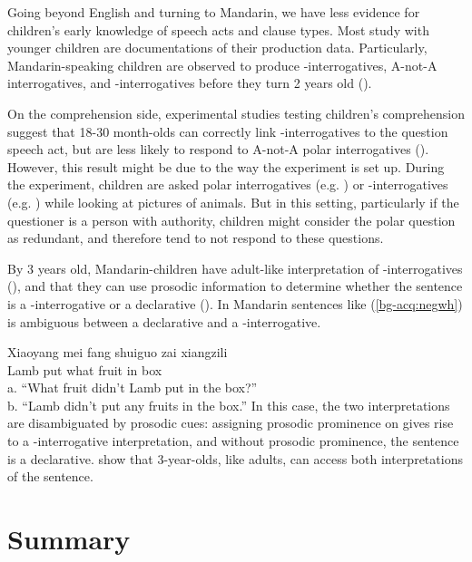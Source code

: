 Going beyond English and turning to Mandarin, we have less evidence for children's early knowledge of speech acts and clause types. Most study with younger children are documentations of their production data. Particularly, Mandarin-speaking children are observed to produce \ma-interrogatives, A-not-A interrogatives, and \twh-interrogatives before they turn 2 years old (\citealt{miao1986acq, miao1992, lee1989acq, litang1991int, lichen1997compprod, lichen1997comp, fan2012, lijingwong2017}). 

On the comprehension side, experimental studies testing children’s comprehension suggest that 18-30 month-olds can correctly link \twh-interrogatives to the question speech act, but are less likely to respond to A-not-A polar interrogatives (\textcite{moradlou2020}). However, this result might be due to the way the experiment is set up. During the experiment, children are asked polar interrogatives (e.g. ) or \twh-interrogatives (e.g. ) while looking at pictures of animals. But in this setting, particularly if the questioner is a person with authority, children might consider the polar question as redundant, and therefore tend to not respond to these questions. 

By 3 years old, Mandarin-children have adult-like interpretation of \twh-interrogatives (\citealt{fahn2003acq}), and that they can use prosodic information to determine whether the sentence is a \twh-interrogative or a declarative (\cite{WHanything}). In Mandarin sentences like  (\ref{bg-acq:negwh}) is ambiguous between a declarative and a \twh-interrogative. 

\gll Xiaoyang mei	fang	 shuiguo zai	xiangzili\\
Lamb \Neg{}	put	what		fruit		in	box\\
\trans a. ``What fruit didn't Lamb put in the box?''\\
b.	``Lamb didn't put any fruits in the box.''
\eex
In this case, the two interpretations are disambiguated by prosodic cues: assigning prosodic prominence on  gives rise to a \twh-interrogative interpretation, and without prosodic prominence, the sentence is a declarative. \textcite{WHanything} show that 3-year-olds, like adults, can access both interpretations of the sentence.

\section{Summary}

